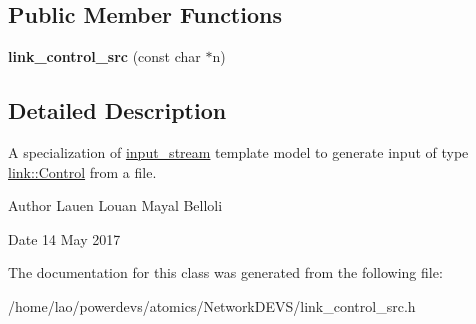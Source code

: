 \subsection*{Public Member Functions}
\begin{DoxyCompactItemize}
\item 
{\bfseries link\+\_\+control\+\_\+src} (const char $\ast$n)\hypertarget{classlink__control__src_a79f13f3b34d4d89a5c2b040a49468e60}{}\label{classlink__control__src_a79f13f3b34d4d89a5c2b040a49468e60}

\end{DoxyCompactItemize}


\subsection{Detailed Description}
A specialization of \hyperlink{classinput__stream}{input\+\_\+stream} template model to generate input of type \hyperlink{structlink_1_1Control}{link\+::\+Control} from a file. 

\begin{DoxyAuthor}{Author}
Lauen Louan Mayal Belloli 
\end{DoxyAuthor}
\begin{DoxyDate}{Date}
14 May 2017 
\end{DoxyDate}


The documentation for this class was generated from the following file\+:\begin{DoxyCompactItemize}
\item 
/home/lao/powerdevs/atomics/\+Network\+D\+E\+V\+S/link\+\_\+control\+\_\+src.\+h\end{DoxyCompactItemize}
